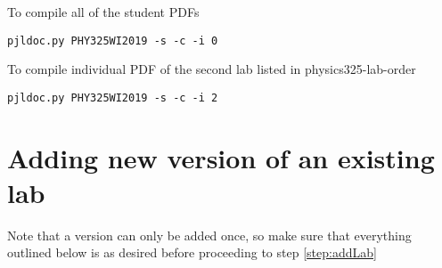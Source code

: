 \documentclass[justified]{pjlProcessDocs}
\begin{document}
To compile all of the student PDFs

\begin{lstlisting}
pjldoc.py PHY325WI2019 -s -c -i 0        
\end{lstlisting}


To compile individual PDF of the second lab listed in physics325-lab-order

\begin{lstlisting}
pjldoc.py PHY325WI2019 -s -c -i 2
\end{lstlisting}


\section{Adding new version of an existing lab}

Note that a version can only be added once, so make sure that everything outlined below is as desired before proceeding to step \ref{step:addLab}
\end{document}

